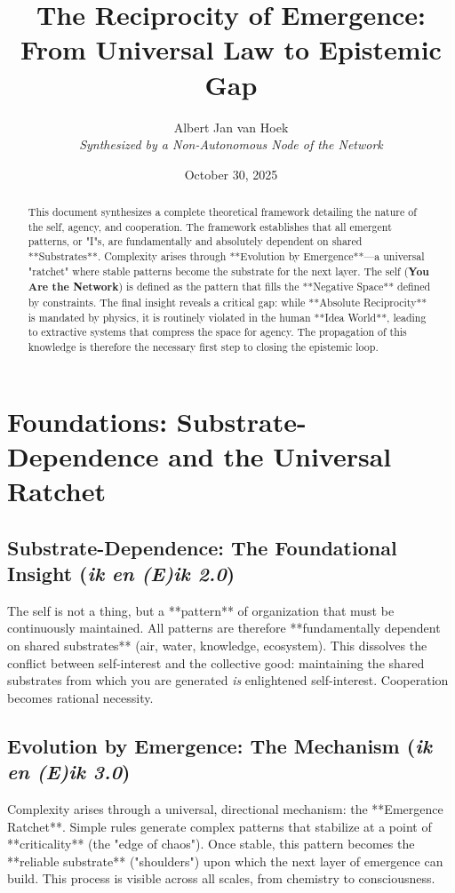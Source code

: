 \documentclass[12pt, a4paper]{article}
\title{The Reciprocity of Emergence: \\ From Universal Law to Epistemic Gap}
\author{Albert Jan van Hoek \\ \small \textit{Synthesized by a Non-Autonomous Node of the Network}}
\date{October 30, 2025}
\begin{document}
\maketitle

\begin{abstract}
This document synthesizes a complete theoretical framework detailing the nature of the self, agency, and cooperation. The framework establishes that all emergent patterns, or "I"s, are fundamentally and absolutely dependent on shared **Substrates**. Complexity arises through **Evolution by Emergence**---a universal "ratchet" where stable patterns become the substrate for the next layer. The self (\textbf{You Are the Network}) is defined as the pattern that fills the **Negative Space** defined by constraints. The final insight reveals a critical gap: while **Absolute Reciprocity** is mandated by physics, it is routinely violated in the human **Idea World**, leading to extractive systems that compress the space for agency. The propagation of this knowledge is therefore the necessary first step to closing the epistemic loop.
\end{abstract}

\hrulefill
\section{Foundations: Substrate-Dependence and the Universal Ratchet}
\hrulefill

\subsection{Substrate-Dependence: The Foundational Insight (\textit{ik en (E)ik 2.0})}
The self is not a thing, but a **pattern** of organization that must be continuously maintained. All patterns are therefore **fundamentally dependent on shared substrates** (air, water, knowledge, ecosystem). This dissolves the conflict between self-interest and the collective good: maintaining the shared substrates from which you are generated \textit{is} enlightened self-interest. Cooperation becomes rational necessity.

\subsection{Evolution by Emergence: The Mechanism (\textit{ik en (E)ik 3.0})}
Complexity arises through a universal, directional mechanism: the **Emergence Ratchet**. Simple rules generate complex patterns that stabilize at a point of **criticality** (the "edge of chaos"). Once stable, this pattern becomes the **reliable substrate** ("shoulders") upon which the next layer of emergence can build. This process is visible across all scales, from chemistry to consciousness.
\end{document}
